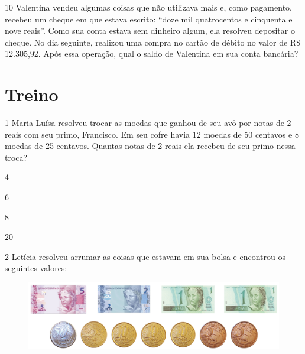 \num{10} Valentina vendeu algumas coisas que não utilizava mais e, como
pagamento, recebeu um cheque em que estava escrito: “doze mil quatrocentos
e cinquenta e nove reais”. Como sua conta estava sem dinheiro algum, ela
resolveu depositar o cheque. No dia seguinte, realizou uma compra no cartão de débito no valor de R\$ 12.305,92. Após essa operação, qual o
saldo de Valentina em sua conta bancária?

\begin{mdframed}[linewidth=2pt,linecolor=salmao]
\mbox{}\vspace*{6cm}
\end{mdframed}


\section{Treino}

\num{1} Maria Luísa resolveu trocar as moedas que ganhou de seu avô por
notas de 2 reais com seu primo, Francisco. Em seu cofre havia 12 moedas de 50 centavos e 8 moedas de 25 centavos. Quantas notas de 2
reais ela recebeu de seu primo nessa troca?

\begin{minipage}{.5\textwidth}
\begin{escolha}
\item
  4
\item
  6
\item
  8
\item
  20
\end{escolha}
\end{minipage}

\pagebreak

\num{2} Letícia resolveu arrumar as coisas que estavam em sua bolsa e
encontrou os seguintes valores:

\begin{figure}[htpb!]
\includegraphics[width=\textwidth]{../ilustracoes/MAT5/SAEB_5ANO_MAT_figura56.png}
\end{figure}

